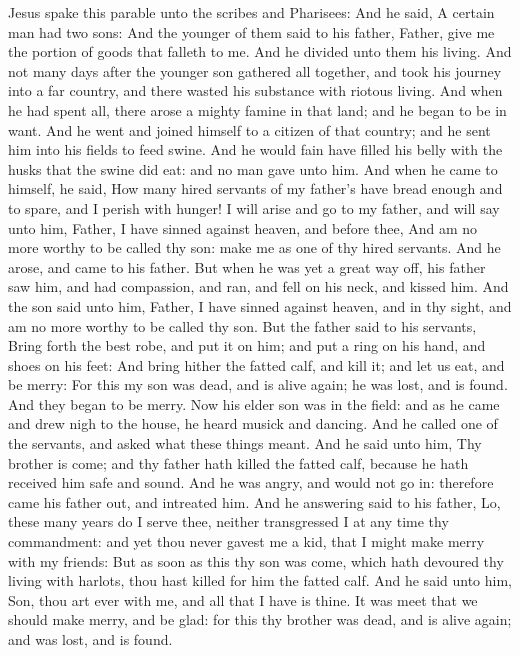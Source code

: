  Jesus spake this parable unto the scribes and Pharisees: And he said, A certain man had two sons: And the younger of them said to his father, Father, give me the portion of goods that falleth to me. And he divided unto them his living. And not many days after the younger son gathered all together, and took his journey into a far country, and there wasted his substance with riotous living. And when he had spent all, there arose a mighty famine in that land; and he began to be in want. And he went and joined himself to a citizen of that country; and he sent him into his fields to feed swine. And he would fain have filled his belly with the husks that the swine did eat: and no man gave unto him. And when he came to himself, he said, How many hired servants of my father's have bread enough and to spare, and I perish with hunger! I will arise and go to my father, and will say unto him, Father, I have sinned against heaven, and before thee, And am no more worthy to be called thy son: make me as one of thy hired servants. And he arose, and came to his father. But when he was yet a great way off, his father saw him, and had compassion, and ran, and fell on his neck, and kissed him. And the son said unto him, Father, I have sinned against heaven, and in thy sight, and am no more worthy to be called thy son. But the father said to his servants, Bring forth the best robe, and put it on him; and put a ring on his hand, and shoes on his feet: And bring hither the fatted calf, and kill it; and let us eat, and be merry: For this my son was dead, and is alive again; he was lost, and is found. And they began to be merry. Now his elder son was in the field: and as he came and drew nigh to the house, he heard musick and dancing. And he called one of the servants, and asked what these things meant. And he said unto him, Thy brother is come; and thy father hath killed the fatted calf, because he hath received him safe and sound. And he was angry, and would not go in: therefore came his father out, and intreated him. And he answering said to his father, Lo, these many years do I serve thee, neither transgressed I at any time thy commandment: and yet thou never gavest me a kid, that I might make merry with my friends: But as soon as this thy son was come, which hath devoured thy living with harlots, thou hast killed for him the fatted calf. And he said unto him, Son, thou art ever with me, and all that I have is thine. It was meet that we should make merry, and be glad: for this thy brother was dead, and is alive again; and was lost, and is found.

